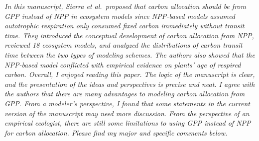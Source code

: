 
\emph{In this manuscript, Sierra et al.~proposed that carbon allocation
should be from GPP instead of NPP in ecosystem models since NPP-based
models assumed autotrophic respiration only consumed fixed carbon
immediately without transit time. They introduced the conceptual
development of carbon allocation from NPP, reviewed 18 ecosystem models,
and analyzed the distributions of carbon transit time between the two
types of modeling schemes. The authors also showed that the NPP-based
model conflicted with empirical evidence on plants' age of respired
carbon. Overall, I enjoyed reading this paper. The logic of the
manuscript is clear, and the presentation of the ideas and perspectives
is precise and neat. I agree with the authors that there are many
advantages to modeling carbon allocation from GPP. From a modeler's
perspective, I found that some statements in the current version of the
manuscript may need more discussion. From the perspective of an
empirical ecologist, there are still some limitations to using GPP
instead of NPP for carbon allocation. Please find my major and specific
comments below.}

